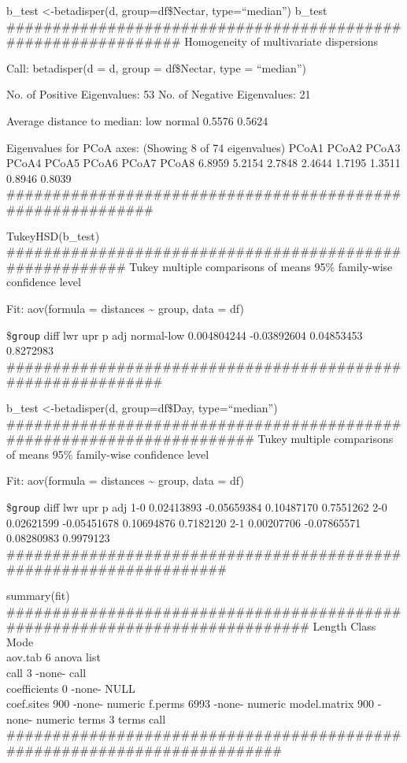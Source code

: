 \documentclass[]{article}
\begin{document}
b\_test \textless{}-betadisper(d, group=df\$Nectar, type=``median'')
b\_test
\#\#\#\#\#\#\#\#\#\#\#\#\#\#\#\#\#\#\#\#\#\#\#\#\#\#\#\#\#\#\#\#\#\#\#\#\#\#\#\#\#\#\#\#\#\#\#\#\#\#\#\#\#\#\#\#\#\#\#\#\#\#
Homogeneity of multivariate dispersions

Call: betadisper(d = d, group = df\$Nectar, type = ``median'')

No. of Positive Eigenvalues: 53 No. of Negative Eigenvalues: 21

Average distance to median: low normal 0.5576 0.5624

Eigenvalues for PCoA axes: (Showing 8 of 74 eigenvalues) PCoA1 PCoA2
PCoA3 PCoA4 PCoA5 PCoA6 PCoA7 PCoA8 6.8959 5.2154 2.7848 2.4644 1.7195
1.3511 0.8946 0.8039
\#\#\#\#\#\#\#\#\#\#\#\#\#\#\#\#\#\#\#\#\#\#\#\#\#\#\#\#\#\#\#\#\#\#\#\#\#\#\#\#\#\#\#\#\#\#\#\#\#\#\#\#\#\#\#\#\#\#\#

TukeyHSD(b\_test)
\#\#\#\#\#\#\#\#\#\#\#\#\#\#\#\#\#\#\#\#\#\#\#\#\#\#\#\#\#\#\#\#\#\#\#\#\#\#\#\#\#\#\#\#\#\#\#\#\#\#\#\#\#\#\#\#
Tukey multiple comparisons of means 95\% family-wise confidence level

Fit: aov(formula = distances \textasciitilde{} group, data = df)

\$\texttt{group} diff lwr upr p adj normal-low 0.004804244 -0.03892604
0.04853453 0.8272983
\#\#\#\#\#\#\#\#\#\#\#\#\#\#\#\#\#\#\#\#\#\#\#\#\#\#\#\#\#\#\#\#\#\#\#\#\#\#\#\#\#\#\#\#\#\#\#\#\#\#\#\#\#\#\#\#\#\#\#\#

b\_test \textless{}-betadisper(d, group=df\$Day, type=``median'')
\#\#\#\#\#\#\#\#\#\#\#\#\#\#\#\#\#\#\#\#\#\#\#\#\#\#\#\#\#\#\#\#\#\#\#\#\#\#\#\#\#\#\#\#\#\#\#\#\#\#\#\#\#\#\#\#\#\#\#\#\#\#\#\#\#\#\#\#\#\#
Tukey multiple comparisons of means 95\% family-wise confidence level

Fit: aov(formula = distances \textasciitilde{} group, data = df)

\$\texttt{group} diff lwr upr p adj 1-0 0.02413893 -0.05659384
0.10487170 0.7551262 2-0 0.02621599 -0.05451678 0.10694876 0.7182120 2-1
0.00207706 -0.07865571 0.08280983 0.9979123
\#\#\#\#\#\#\#\#\#\#\#\#\#\#\#\#\#\#\#\#\#\#\#\#\#\#\#\#\#\#\#\#\#\#\#\#\#\#\#\#\#\#\#\#\#\#\#\#\#\#\#\#\#\#\#\#\#\#\#\#\#\#\#\#\#\#\#

summary(fit)
\#\#\#\#\#\#\#\#\#\#\#\#\#\#\#\#\#\#\#\#\#\#\#\#\#\#\#\#\#\#\#\#\#\#\#\#\#\#\#\#\#\#\#\#\#\#\#\#\#\#\#\#\#\#\#\#\#\#\#\#\#\#\#\#\#\#\#\#\#\#\#\#\#\#\#\#
Length Class Mode\\
aov.tab 6 anova list\\
call 3 -none- call\\
coefficients 0 -none- NULL\\
coef.sites 900 -none- numeric f.perms 6993 -none- numeric model.matrix
900 -none- numeric terms 3 terms call\\
\#\#\#\#\#\#\#\#\#\#\#\#\#\#\#\#\#\#\#\#\#\#\#\#\#\#\#\#\#\#\#\#\#\#\#\#\#\#\#\#\#\#\#\#\#\#\#\#\#\#\#\#\#\#\#\#\#\#\#\#\#\#\#\#\#\#\#\#\#\#\#\#\#
\end{document}
